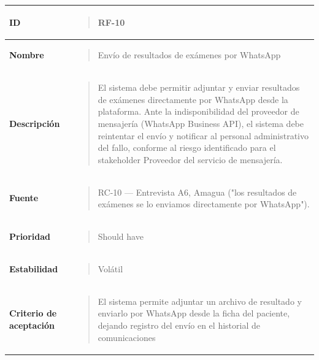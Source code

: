 \documentclass[
]{article}
\newcounter{none} %
\begin{document}
{\def\LTcaptype{none} %
\begin{longtable}[]{@{}
  >{\raggedright\arraybackslash}p{}
  >{\raggedright\arraybackslash}p{}@{}}
\toprule\noalign{}
\begin{minipage}[b]{\linewidth}\raggedright
\textbf{ID}
\end{minipage} & \begin{minipage}[b]{\linewidth}\raggedright
\begin{quote}
RF-10
\end{quote}
\end{minipage} \\
\midrule\noalign{}
\endhead
\bottomrule\noalign{}
\endlastfoot
\textbf{Nombre} & \begin{minipage}[t]{\linewidth}\raggedright
\begin{quote}
Envío de resultados de exámenes por WhatsApp
\end{quote}
\end{minipage} \\
\textbf{Descripción} & \begin{minipage}[t]{\linewidth}\raggedright
\begin{quote}
El sistema debe permitir adjuntar y enviar resultados de exámenes
directamente por WhatsApp desde la plataforma. Ante la indisponibilidad
del proveedor de mensajería (WhatsApp Business API), el sistema debe
reintentar el envío y notificar al personal administrativo del fallo,
conforme al riesgo identificado para el stakeholder Proveedor del
servicio de mensajería.
\end{quote}
\end{minipage} \\
\textbf{Fuente} & \begin{minipage}[t]{\linewidth}\raggedright
\begin{quote}
RC-10 --- Entrevista A6, Amagua ("los resultados de exámenes se lo
enviamos directamente por WhatsApp").
\end{quote}
\end{minipage} \\
\textbf{Prioridad} & \begin{minipage}[t]{\linewidth}\raggedright
\begin{quote}
Should have
\end{quote}
\end{minipage} \\
\textbf{Estabilidad} & \begin{minipage}[t]{\linewidth}\raggedright
\begin{quote}
Volátil
\end{quote}
\end{minipage} \\
\textbf{Criterio de aceptación} &
\begin{minipage}[t]{\linewidth}\raggedright
\begin{quote}
El sistema permite adjuntar un archivo de resultado y enviarlo por
WhatsApp desde la ficha del paciente, dejando registro del envío en el
historial de comunicaciones


\end{quote}
\end{minipage}
\end{longtable}}
\end{document}
